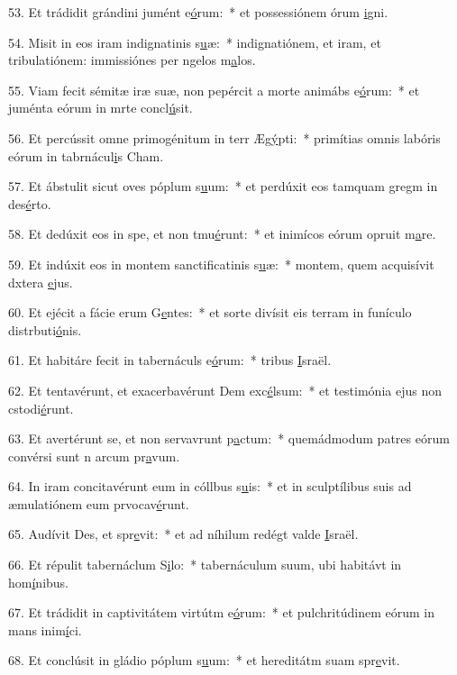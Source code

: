 53. Et trádidit grándini jumént e\uline{ó}rum:~* et possessiónem órum \uline{i}gni.\par 
54. Misit in eos iram indignatinis s\uline{u}æ:~* indignatiónem, et iram, et tribulatiónem: immissiónes per ngelos m\uline{a}los.\par 
55. Viam fecit sémitæ iræ suæ, non pepércit a morte animábs e\uline{ó}rum:~* et juménta eórum in mrte concl\uline{ú}sit.\par 
56. Et percússit omne primogénitum in terr Æg\uline{ý}pti:~* primítias omnis labóris eórum in tabrnácul\uline{i}s Cham.\par 
57. Et ábstulit sicut oves póplum s\uline{u}um:~* et perdúxit eos tamquam gregm in des\uline{é}rto.\par 
58. Et dedúxit eos in spe, et non tmu\uline{é}runt:~* et inimícos eórum opruit m\uline{a}re.\par 
59. Et indúxit eos in montem sanctificatinis s\uline{u}æ:~* montem, quem acquisívit dxtera \uline{e}jus.\par 
60. Et ejécit a fácie erum G\uline{e}ntes:~* et sorte divísit eis terram in funículo distrbuti\uline{ó}nis.\par 
61. Et habitáre fecit in tabernáculs e\uline{ó}rum:~* tribus \uline{I}sraël.\par 
62. Et tentavérunt, et exacerbavérunt Dem exc\uline{é}lsum:~* et testimónia ejus non cstodi\uline{é}runt.\par 
63. Et avertérunt se, et non servavrunt p\uline{a}ctum:~* quemádmodum patres eórum convérsi sunt n arcum pr\uline{a}vum.\par 
64. In iram concitavérunt eum in cóllbus s\uline{u}is:~* et in sculptílibus suis ad æmulatiónem eum prvocav\uline{é}runt.\par 
65. Audívit Des, et spr\uline{e}vit:~* et ad níhilum redégt valde \uline{I}sraël.\par 
66. Et répulit tabernáclum S\uline{i}lo:~* tabernáculum suum, ubi habitávt in hom\uline{í}nibus.\par 
67. Et trádidit in captivitátem virtútm e\uline{ó}rum:~* et pulchritúdinem eórum in mans inim\uline{í}ci.\par 
68. Et conclúsit in gládio póplum s\uline{u}um:~* et hereditátm suam spr\uline{e}vit.\par 
